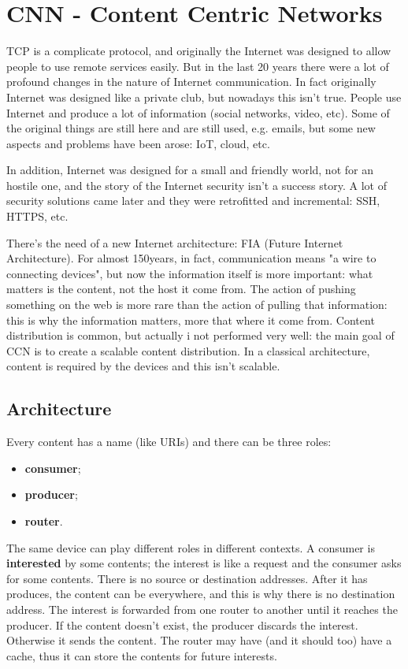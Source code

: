 \section{CNN - Content Centric Networks}
TCP is a complicate protocol, and originally the Internet was designed to allow
people to use remote services easily. But in the last 20 years there were a lot
of profound changes in the nature of Internet communication. In fact originally
Internet was designed like a private club, but nowadays this isn't true. People
use Internet and produce a lot of information (social networks, video, etc).
Some of the original things are still here and are still used, e.g. emails, but
some new aspects and problems have been arose: IoT, cloud, etc.

In addition, Internet was designed for a small and friendly world, not for an
hostile one, and the story of the Internet security isn't a success story. A
lot of security solutions came later and they were retrofitted and incremental:
SSH, HTTPS, etc.

There's the need of a new Internet architecture: FIA (Future Internet
Architecture). For almost 150years, in fact, communication means "a wire to
connecting devices", but now the information itself is more important: what
matters is the content, not the host it come from. The action of pushing
something on the web is more rare than the action of pulling that information:
this is why the information matters, more that where it come from. Content
distribution is common, but actually i not performed very well: the main goal
of CCN is to create a scalable content distribution. In a classical
architecture, content is required by the devices and this isn't scalable.

\subsection{Architecture}
Every content has a name (like URIs) and there can be three roles:
\begin{itemize}
  \item \textbf{consumer};
  \item \textbf{producer};
  \item \textbf{router}.
\end{itemize}
The same device can play different roles in different contexts. A consumer is
\textbf{interested} by some contents; the interest is like a request and the
consumer asks for some contents. There is no source or destination addresses.
After it has produces, the content can be everywhere, and this is why there is
no destination address. The interest is forwarded from one router to another
until it reaches the producer. If the content doesn't exist, the producer
discards the interest. Otherwise it sends the content. The router may have (and
it should too) have a cache, thus it can store the contents for future
interests.


